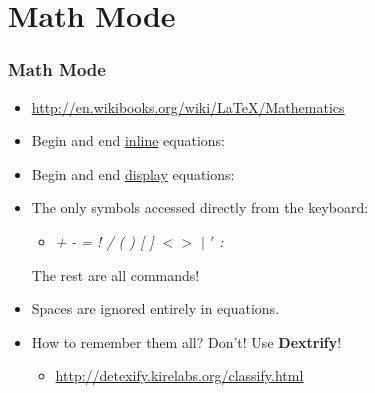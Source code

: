 \documentclass[notes=only]{beamer}
\newcommand{\snip}[1]
{
    
}
\begin{document}
\section{Math Mode}


\begin{frame} \frametitle{Math Mode}
    \begin{itemize}
        \item \url{http://en.wikibooks.org/wiki/LaTeX/Mathematics}
        \item Begin and end \underline{inline} equations: \vspace{-6pt}
        \begin{itemize} \snip{inline.tex} \end{itemize}\vspace{-10pt}
        \item Begin and end \underline{display} equations:
        \begin{itemize} \snip{displayequation.tex} \end{itemize}
        \item The only symbols accessed directly from the keyboard:  
        \begin{itemize} \item \textit{+ - = ! / ( ) [ ] $< >$ $|$ $'$ :} \end{itemize}
        The rest are all commands!
        \item Spaces are ignored entirely in equations.
        \item How to remember them all?  Don't!  Use \textbf{Dextrify}!
        \begin{itemize} \item \url{http://detexify.kirelabs.org/classify.html} \end{itemize}
    \end{itemize}
\end{frame}
\end{document}
